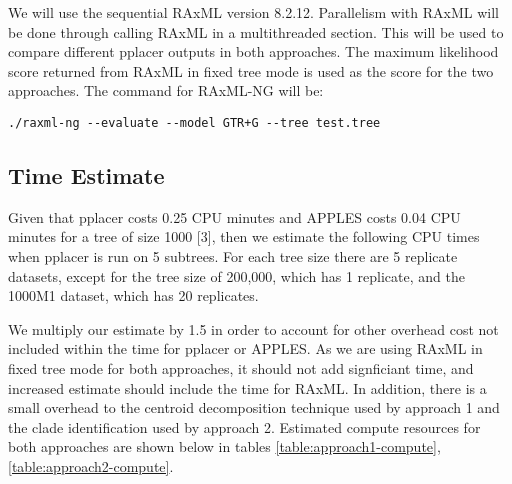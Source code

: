 \documentclass[11pt]{article}
\begin{document}
We will use the sequential RAxML version 8.2.12. Parallelism with RAxML
will be done through calling RAxML in a multithreaded section. This will
be used to compare different pplacer outputs in both approaches. The
maximum likelihood score returned from RAxML in fixed tree mode is used
as the score for the two approaches. The command for RAxML-NG will be:

\begin{verbatim}
./raxml-ng --evaluate --model GTR+G --tree test.tree
\end{verbatim}

\subsection{Time Estimate}

Given that pplacer costs 0.25 CPU minutes and APPLES costs 0.04 CPU
minutes for a tree of size 1000 {[}3{]}, then we estimate the following
CPU times when pplacer is run on 5 subtrees. For each tree size there
are 5 replicate datasets, except for the tree size of 200,000, which has
1 replicate, and the 1000M1 dataset, which has 20 replicates.

We multiply our estimate by 1.5 in order to account for other overhead
cost not included within the time for pplacer or APPLES. As we are using
RAxML in fixed tree mode for both approaches, it should not add
signficiant time, and increased estimate should include the time for
RAxML. In addition, there is a small overhead to the centroid
decomposition technique used by approach 1 and the clade identification
used by approach 2. Estimated compute resources for both approaches are
shown below in tables \ref{table:approach1-compute},
\ref{table:approach2-compute}.
\end{document}
